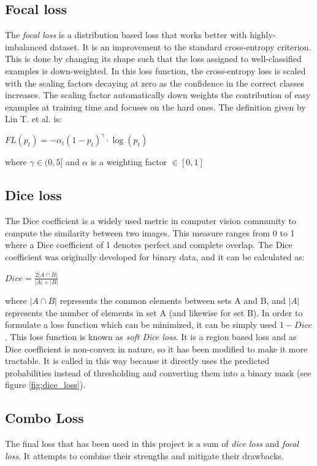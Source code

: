\documentclass[a4paper,10pt]{report}
\begin{document}
\subsection{Focal loss}\label{subsec:subsection-361}
The \textit{focal loss} is a distribution based loss that works better with highly-imbalanced dataset.
It is an improvement to the standard cross-entropy criterion. This is done by changing its shape such that the loss assigned to well-classified examples is down-weighted. In this loss function, the cross-entropy loss is scaled with the scaling factors decaying at zero as the confidence in the correct classes increases. The scaling factor automatically down weights the contribution of easy examples at training time and focuses on the hard ones.
The definition given by Lin T. et al. \cite{focal_loss} is: 
\begin{center}
    $FL(p_t) = -\alpha_t(1 - p_t)^\gamma \cdot \log(p_t)$
\end{center}
where $\gamma \in (0,5]$ and $\alpha$ is a weighting factor $\in [0,1]$

\subsection{Dice loss}\label{subsec:subsection-362}
The Dice coefficient is a widely used metric in computer
vision community to compute the similarity between two
images. This measure ranges from 0 to 1 where a Dice coefficient of 1 denotes perfect and complete overlap. The Dice coefficient was originally developed for binary data, and it can be calculated as: 
\begin{center}
    $Dice = \frac{{2\left| {A \cap B} \right|}}{{\left| A \right| + \left| B \right|}}$
\end{center}

where $\left| {A \cap B} \right|$ represents the common elements between sets A and B, and $\left| A \right|$ represents the number of elements in set A (and likewise for set B).
In order to formulate a loss function which can be minimized, it can be simply used $1 - Dice$. This loss function is known as \textit{soft Dice loss}. It is a region based loss and as Dice coefficient is non-convex in nature, so it has been modified to make it more tractable. It is called in this way because it directly uses the predicted probabilities instead of thresholding and converting them into a binary mask (see figure \ref{fig:dice_loss}). 

\subsection{Combo Loss}\label{subsec:subsection-363}
The final loss that has been used in this project is a sum of \textit{dice loss} and \textit{focal loss}. It attempts to combine their strengths and mitigate their drawbacks.
\end{document}
